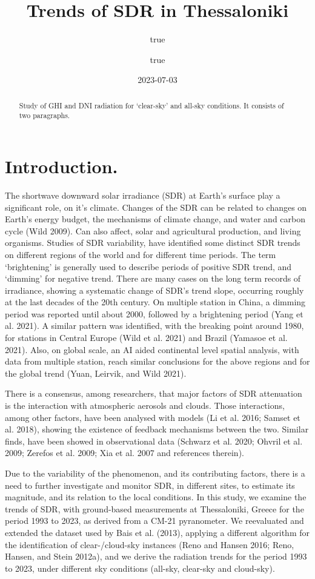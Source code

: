 \documentclass[
  preprint, 3p, authoryear]{article}
\title{Trends of SDR in Thessaloniki}
\author{true \and true}
\date{2023-07-03}
\begin{document}
\maketitle
\begin{abstract}
Study of GHI and DNI radiation for `clear-sky' and all-sky conditions.
It consists of two paragraphs.
\end{abstract}

\hypertarget{introduction.}{%
\section{Introduction.}\label{introduction.}}

The shortwave downward solar irradiance (SDR) at Earth's surface play a significant role, on it's climate.
Changes of the SDR can be related to changes on Earth's energy budget, the mechanisms of climate change, and water and carbon cycle (Wild 2009).
Can also affect, solar and agricultural production, and living organisms.
Studies of SDR variability, have identified some distinct SDR trends on different regions of the world and for different time periods.
The term `brightening' is generally used to describe periods of positive SDR trend, and `dimming' for negative trend.
There are many cases on the long term records of irradiance, showing a systematic change of SDR's trend slope, occurring roughly at the last decades of the 20th century.
On multiple station in China, a dimming period was reported until about 2000, followed by a brightening period (Yang et al. 2021).
A similar pattern was identified, with the breaking point around 1980, for stations in Central Europe (Wild et al. 2021) and Brazil (Yamasoe et al. 2021).
Also, on global scale, an AI aided continental level spatial analysis, with data from multiple station, reach similar conclusions for the above regions and for the global trend (Yuan, Leirvik, and Wild 2021).

There is a consensus, among researchers, that major factors of SDR attenuation is the interaction with atmospheric aerosols and clouds.
Those interactions, among other factors, have been analysed with models (Li et al. 2016; Samset et al. 2018), showing the existence of feedback mechanisms between the two.
Similar finds, have been showed in observational data (Schwarz et al. 2020; Ohvril et al. 2009; Zerefos et al. 2009; Xia et al. 2007 and references therein).

Due to the variability of the phenomenon, and its contributing factors, there is a need to further investigate and monitor SDR, in different sites, to estimate its magnitude, and its relation to the local conditions.
In this study, we examine the trends of SDR, with ground-based measurements at Thessaloniki, Greece for the period 1993 to 2023, as derived from a CM-21 pyranometer.
We reevaluated and extended the dataset used by Bais et al. (2013), applying a different algorithm for the identification of clear-/cloud-sky instances (Reno and Hansen 2016; Reno, Hansen, and Stein 2012a), and we derive the radiation trends for the period 1993 to 2023, under different sky conditions (all-sky, clear-sky and cloud-sky).
\end{document}
